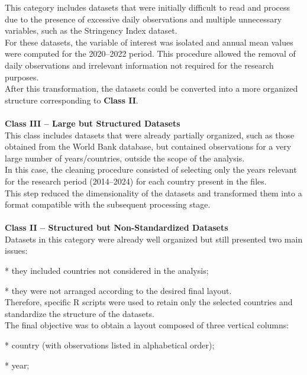 This category includes datasets that were initially difficult to read and process due to the presence of excessive daily observations and multiple unnecessary variables, such as the Stringency Index dataset.\\
For these datasets, the variable of interest was isolated and annual mean values were computed for the 2020–2022 period. This procedure allowed the removal of daily observations and irrelevant information not required for the research purposes.\\
After this transformation, the datasets could be converted into a more organized structure corresponding to \textbf{Class II}.
\\\\
\textbf{Class III – Large but Structured Datasets}\\
This class includes datasets that were already partially organized, such as those obtained from the World Bank database, but contained observations for a very large number of years/countries, outside the scope of the analysis.\\
In this case, the cleaning procedure consisted of selecting only the years relevant for the research period (2014–2024) for each country present in the files.\\
This step reduced the dimensionality of the datasets and transformed them into a format compatible with the subsequent processing stage.
\\\\
\textbf{Class II – Structured but Non-Standardized Datasets}\\
Datasets in this category were already well organized but still presented two main issues:

* they included countries not considered in the analysis;

* they were not arranged according to the desired final layout.\\
Therefore, specific R scripts were used to retain only the selected countries and standardize the structure of the datasets.\\
The final objective was to obtain a layout composed of three vertical columns:

* country (with observations listed in alphabetical order);

* year;

